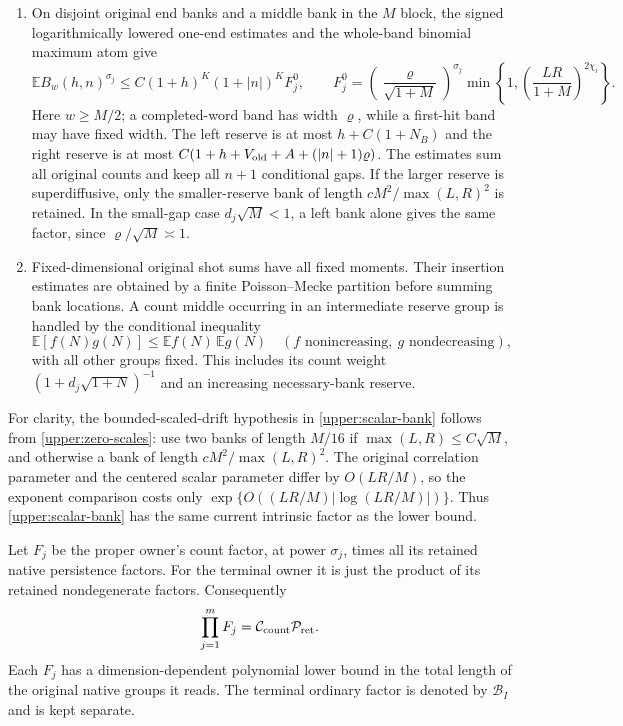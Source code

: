 \begin{proposition}
\begin{enumerate}
\item On disjoint original end banks and a middle bank in the $M$
block, the signed logarithmically lowered one-end estimates and the
whole-band binomial maximum atom give
\begin{equation}
 \mathbb E B_w(h,n)^{\sigma_j}
 \leq C(1+h)^K(1+|n|)^K F_j^0,
 \qquad
 F_j^0=\left(\frac{\varrho}{\sqrt{1+M}}\right)^{\sigma_j}
       \min\left\{1,\left(\frac{LR}{1+M}\right)^{2\chi_i}\right\}.
 \label{upper:scalar-bank}
\end{equation}
Here $w\geq M/2$; a completed-word band has width $\varrho$, while a
first-hit band may have fixed width.  The left reserve is at most
$h+C(1+N_B)$ and the right reserve is at most
$C(1+h+V_{\rm old}+A+(|n|+1)\varrho)$.  The estimates sum all
original counts and keep all $n+1$ conditional gaps.  If the larger
reserve is superdiffusive, only the smaller-reserve bank of length
$cM^2/\max(L,R)^2$ is retained.  In the small-gap case
$d_j\sqrt M<1$, a left bank alone gives the same factor, since
$\varrho/\sqrt M\asymp1$.

\item Fixed-dimensional original shot sums have all fixed moments.
Their insertion estimates are obtained by a finite Poisson--Mecke
partition before summing bank locations.  A count middle occurring in
an intermediate reserve group is handled by the conditional inequality
\begin{equation}
 \mathbb E[f(N)g(N)]\leq\mathbb Ef(N)\,\mathbb Eg(N)
 \quad(f\text{ nonincreasing},\ g\text{ nondecreasing}),
 \label{upper:opposite-monotonicity}
\end{equation}
with all other groups fixed.  This includes its count weight
$(1+d_j\sqrt{1+N})^{-1}$ and an increasing necessary-bank reserve.
\end{enumerate}
\end{proposition}

For clarity, the bounded-scaled-drift hypothesis in
\eqref{upper:scalar-bank} follows from \eqref{upper:zero-scales}:
use two banks of length $M/16$ if $\max(L,R)\leq C\sqrt M$,
and otherwise a bank of length $cM^2/\max(L,R)^2$.  The original
correlation parameter and the centered scalar parameter differ by
$O(LR/M)$, so the exponent comparison costs only
$\exp\{O((LR/M)|\log(LR/M)|)\}$.  Thus \eqref{upper:scalar-bank}
has the same current intrinsic factor as the lower bound.

Let $F_j$ be the proper owner's count factor, at power $\sigma_j$,
times all its retained native persistence factors.  For the terminal
owner it is just the product of its retained nondegenerate factors.
Consequently
\begin{equation}
 \prod_{j=1}^m F_j=\mathcal C_{\rm count}\mathcal P_{\rm ret}.
 \label{upper:factor-product}
\end{equation}
Each $F_j$ has a dimension-dependent polynomial lower bound in the
total length of the original native groups it reads.  The terminal
ordinary factor is denoted by $\mathcal B_I$ and is kept separate.

